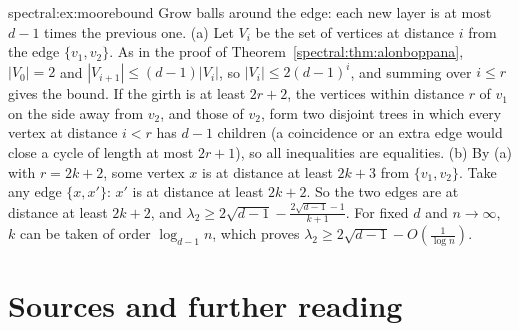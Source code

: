 \begin{solution}{spectral:ex:moorebound}
\idea Grow balls around the edge: each new layer is at most $d-1$ times the previous one.
\writeup (a) Let $V_i$ be the set of vertices at distance $i$ from the edge $\{v_1,v_2\}$. As in the proof of Theorem~\ref{spectral:thm:alonboppana}, $|V_0|=2$ and $|V_{i+1}|\le(d-1)|V_i|$, so $|V_i|\le2(d-1)^i$, and summing over
$i\le r$ gives the bound. If the girth is at least $2r+2$, the vertices within distance $r$ of $v_1$ on the side away from $v_2$, and those of $v_2$, form two disjoint trees in which every vertex at
distance $i<r$ has $d-1$ children (a coincidence or an extra edge would close a cycle of length at most $2r+1$), so all inequalities are equalities.
(b) By (a) with $r=2k+2$, some vertex $x$ is at distance at least $2k+3$ from $\{v_1,v_2\}$. Take any edge $\{x,x'\}$: $x'$ is at distance at least $2k+2$. So the two edges are at distance at least
$2k+2$, and $\lambda_2\ge2\sqrt{d-1}-\frac{2\sqrt{d-1}-1}{k+1}$. For fixed $d$ and $n\to\infty$, $k$ can be taken of order $\log_{d-1}n$, which proves $\lambda_2\ge2\sqrt{d-1}-O(\frac1{\log n})$.
\end{solution}

\section*{Sources and further reading}

